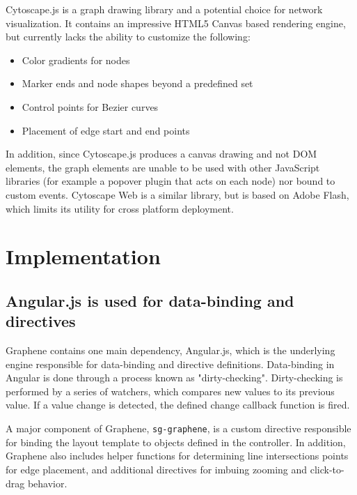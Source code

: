 Cytoscape.js \autocite{cytoscape2014js} is a graph drawing library and a potential choice for network visualization. 
It contains an impressive HTML5 Canvas based rendering engine, but currently lacks the ability to customize the following:

\begin{itemize}
\item Color gradients for nodes
\item Marker ends and node shapes beyond a predefined set
\item Control points for Bezier curves
\item Placement of edge start and end points
\end{itemize}

In addition, since Cytoscape.js produces a canvas drawing and not DOM elements, the graph elements are unable to be used with other JavaScript libraries (for example a popover plugin that acts on each node) nor bound to custom events.
Cytoscape Web \autocite{cytoscape2014web} is a similar library, but is based on Adobe Flash, which limits its utility for cross platform deployment.





\section{Implementation}

\subsection{Angular.js is used for data-binding and directives}
Graphene contains one main dependency, Angular.js, which is the underlying engine responsible for data-binding and directive definitions.
Data-binding in Angular is done through a process known as "dirty-checking".
Dirty-checking is performed by a series of watchers, which compares new values to its previous value. \autocite{google2014angularScope}
If a value change is detected, the defined change callback function is fired.

A major component of Graphene, \texttt{sg-graphene}, is a custom directive responsible for binding the layout template to objects defined in the controller.
In addition, Graphene also includes helper functions for determining line intersections points for edge placement, and additional directives for imbuing zooming and click-to-drag behavior.


